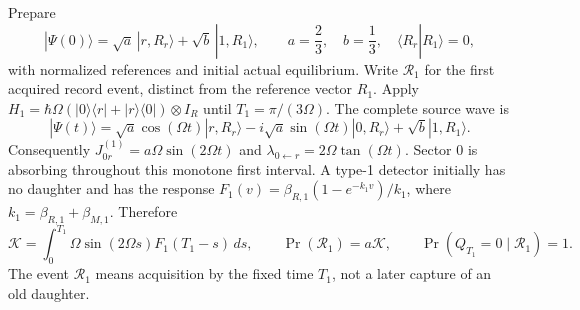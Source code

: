 \documentclass[11pt,oneside,openany]{book}
\theoremstyle{definition}
\theoremstyle{remark}\newtheorem{remark}[theorem]{Remark}
\begin{document}
Prepare
\begin{equation}
 |\Psi(0)\rangle=\sqrt a\,|r,R_r\rangle+\sqrt b\,|1,R_1\rangle,
 \qquad a=\frac23,\quad b=\frac13,\quad
 \langle R_r|R_1\rangle=0,
 \label{bench:history-initial}
\end{equation}
with normalized references and initial actual equilibrium.
Write $\mathcal R_1$ for the first acquired record event, distinct
from the reference vector $R_1$. Apply
$H_1=\hbar\Omega(|0\rangle\langle r|+|r\rangle\langle0|)\otimes I_R$
until $T_1=\pi/(3\Omega)$. The complete source wave is
\begin{equation}
 |\Psi(t)\rangle=
 \sqrt a\cos(\Omega t)|r,R_r\rangle
 -i\sqrt a\sin(\Omega t)|0,R_r\rangle
 +\sqrt b|1,R_1\rangle.
 \label{bench:history-first-wave}
\end{equation}
Consequently $J^{(1)}_{0r}=a\Omega\sin(2\Omega t)$ and
$\lambda_{0\leftarrow r}=2\Omega\tan(\Omega t)$.
Sector 0 is absorbing throughout this monotone first interval.
A type-1 detector initially has no daughter and has the response
$F_1(v)=\beta_{R,1}(1-e^{-k_1v})/k_1$,
where $k_1=\beta_{R,1}+\beta_{M,1}$. Therefore
\begin{equation}
 \mathcal K=\int_0^{T_1}\Omega\sin(2\Omega s)F_1(T_1-s)\,ds,
 \qquad
 \Pr(\mathcal R_1)=a\mathcal K,\qquad
 \Pr(Q_{T_1}=0\mid\mathcal R_1)=1.
 \label{bench:history-first-record}
\end{equation}
The event $\mathcal R_1$ means acquisition by the fixed time $T_1$,
not a later capture of an old daughter.
\end{document}
